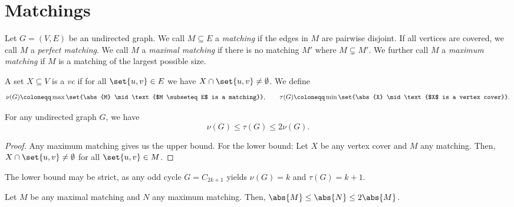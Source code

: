 \documentclass[language=english,algolist,acrolist]{TemplateLecture}
\begin{document}
\setcounter{chapter}{0}


\chapter{Matchings}

Let $G = (V, E)$ be an undirected graph. We call $M \subseteq E$ a \emph{matching} if the edges in $M$ are pairwise disjoint. If all vertices are covered, we call $M$ a \emph{perfect matching}. We call $M$ a \emph{maximal matching} if there is no matching $M'$ where $M \subsetneq M'$. We further call $M$ a \emph{maximum matching} if $M$ is a matching of the largest possible size.

A set $X \subseteq V$ is a \emph{\ac{vc}} if for all $\set{u, v} \in E$ we have $X \cap \set{u,v} \neq \emptyset$. We define 
\begin{equation*}
    \nu(G) \coloneqq \max\set{\abs{M} \mid \text{$M \subseteq E$ is a matching}}, \qquad \tau(G) \coloneqq \min\set{\abs{X} \mid \text{$X$ is a vertex cover}}.
\end{equation*}

\begin{prop}
    For any undirected graph $G$, we have 
    \begin{equation*}
        \nu(G) \leq \tau(G) \leq 2\nu(G).
    \end{equation*}
\end{prop}
\begin{proof}
    Any maximum matching gives us the upper bound. For the lower bound: Let $X$ be any vertex cover and $M$ any matching. Then, $X \cap \set{u,v} \neq \emptyset$ for all $\set{u,v} \in M$.
\end{proof}

The lower bound may be strict, as any odd cycle $G = C_{2k+1}$ yields $\nu(G) = k$ and $\tau(G) = k + 1$.

\begin{prop}
    Let $M$ be any maximal matching and $N$ any maximum matching. Then, $\abs{M} \leq \abs{N} \leq 2\abs{M}$.
\end{prop}
\end{document}
